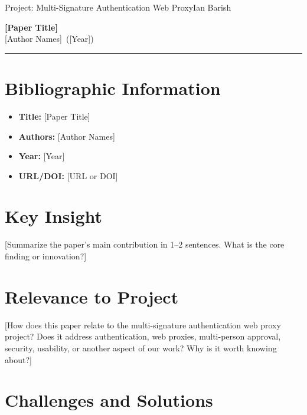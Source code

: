 \documentclass[12pt]{article}
\newcommand{\ProjectTitle}{Multi-Signature Authentication Web Proxy}
\newcommand{\AuthorName}{Ian Barish}
\newcommand{\PaperTitle}{[Paper Title]}
\newcommand{\PaperAuthors}{[Author Names]}
\newcommand{\PaperYear}{[Year]}
\newcommand{\PaperURL}{[URL or DOI]}
\begin{document}
\noindent Project: \ProjectTitle \hfill \AuthorName \\[0.2em]
\begin{center}
  {\large \textbf{\PaperTitle}} \\[0.3em]
  \PaperAuthors \ (\PaperYear)
\end{center}

\noindent\rule{\linewidth}{0.4pt}

\section{Bibliographic Information}

\begin{itemize}[leftmargin=1.5em, itemsep=2pt]
  \item \textbf{Title:} \PaperTitle
  \item \textbf{Authors:} \PaperAuthors
  \item \textbf{Year:} \PaperYear
  \item \textbf{URL/DOI:} \PaperURL
\end{itemize}

\section{Key Insight}

[Summarize the paper's main contribution in 1--2 sentences. What is the core finding or innovation?]

\section{Relevance to Project}

[How does this paper relate to the multi-signature authentication web proxy project? Does it address authentication, web proxies, multi-person approval, security, usability, or another aspect of our work? Why is it worth knowing about?]

\section{Challenges and Solutions}
\end{document}
